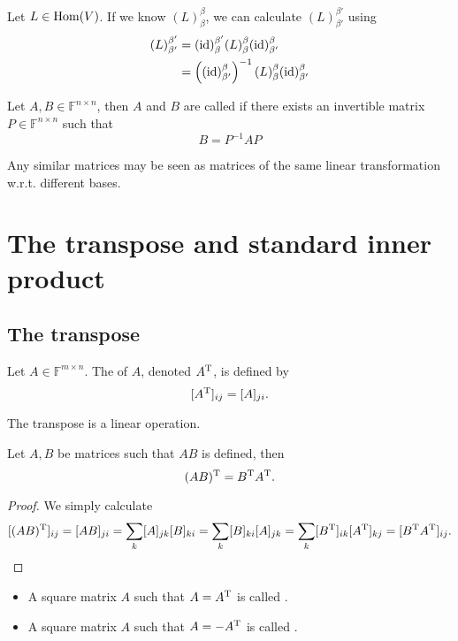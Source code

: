 Let $L\in \operatorname{Hom}(V)$. If we know $(L)_\beta^\beta$, we can calculate $(L)_{\beta'}^{\beta'}$ using
\begin{align*}
(L)_{\beta'}^{\beta'} &= (\operatorname{id})_{\beta}^{\beta'}(L)_\beta^\beta(\operatorname{id})_{\beta'}^{\beta} \\
&= \left((\operatorname{id})_{\beta'}^{\beta}\right)^{-1}(L)_\beta^\beta(\operatorname{id})_{\beta'}^{\beta}
\end{align*}
\begin{definition}
Let $A,B\in \mathbb{F}^{n\times n}$, then $A$ and $B$ are called  if there exists an invertible matrix $P\in\mathbb{F}^{n\times n}$ such that
\[ B = P^{-1}A P\] 
\end{definition}

Any similar matrices may be seen as matrices of the same linear transformation w.r.t. different bases.



\section{The transpose and standard inner product}
\subsection{The transpose}
\begin{definition}
Let $A\in \mathbb{F}^{m\times n}$. The  of $A$, denoted $A^{\mathrm{T}}$, is defined by
\[ [A^{\mathrm{T}}]_{ij} = [A]_{ji}. \]
\end{definition}
\begin{lemma}
The transpose is a linear operation.
\end{lemma}

\begin{lemma}
Let $A,B$ be matrices such that $AB$ is defined, then
\[ (AB)^{\mathrm{T}} = B^{\mathrm{T}} A^{\mathrm{T}}. \]
\end{lemma}
\begin{proof}
We simply calculate
\[ [(AB)^{\mathrm{T}}]_{ij} = [AB]_{ji} = \sum_{k}[A]_{jk}[B]_{ki} = \sum_{k}[B]_{ki}[A]_{jk} = \sum_{k}[B^{\mathrm{T}}]_{ik}[A^{\mathrm{T}}]_{kj} = [B^{\mathrm{T}} A^{\mathrm{T}}]_{ij}. \]
\end{proof}

\begin{definition}
\begin{itemize}
\item A square matrix $A$ such that $A=A^{\mathrm{T}}$ is called .
\item A square matrix $A$ such that $A=-A^{\mathrm{T}}$ is called .
\end{itemize}
\end{definition}

